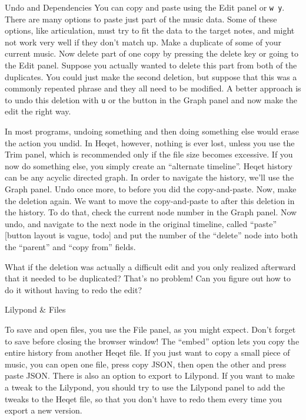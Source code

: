 \documentclass{article}
\begin{document}
\begin{section}{Undo and Dependencies}
You can copy and paste using the Edit panel or \texttt{w y}. There are many options to paste just part of the music data. Some of these options, like articulation, must try to fit the data to the target notes, and might not work very well if they don't match up. Make a duplicate of some of your current music. Now delete part of one copy by pressing the delete key or going to the Edit panel. Suppose you actually wanted to delete this part from both of the duplicates. You could just make the second deletion, but suppose that this was a commonly repeated phrase and they all need to be modified. A better approach is to undo this deletion with \texttt{u} or the button in the Graph panel and now make the edit the right way. 

In most programs, undoing something and then doing something else would erase the action you undid. In Heqet, however, nothing is ever lost, unless you use the Trim panel, which is recommended only if the file size becomes excessive. If you now do something else, you simply create an ``alternate timeline''. Heqet history can be any acyclic directed graph. In order to navigate the history, we'll use the Graph panel. Undo once more, to before you did the copy-and-paste. Now, make the deletion again. We want to move the copy-and-paste to after this deletion in the history. To do that, check the current node number in the Graph panel. Now undo, and navigate to the next node in the original timeline, called ``paste'' [button layout is vague, todo] and put the number of the ``delete'' node into both the ``parent'' and ``copy from'' fields.

What if the deletion was actually a difficult edit and you only realized afterward that it needed to be duplicated? That's no problem! Can you figure out how to do it without having to redo the edit?


\end{section}



\begin{section}{Lilypond \& Files}

To save and open files, you use the File panel, as you might expect. Don't forget to save before closing the browser window! The ``embed'' option lets you copy the entire history from another Heqet file. If you just want to copy a small piece of music, you can open one file, press copy JSON, then open the other and press paste JSON. There is also an option to export to Lilypond. If you want to make a tweak to the Lilypond, you should try to use the Lilypond panel to add the tweaks to the Heqet file, so that you don't have to redo them every time you export a new version.

\end{section}
\end{document}
